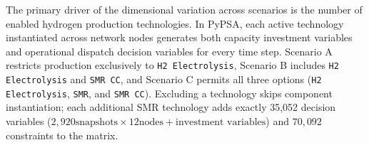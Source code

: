 \documentclass[preprint,12pt]{elsarticle}
\begin{document}
The primary driver of the dimensional variation across scenarios is the number of enabled hydrogen production technologies. In PyPSA, each active technology instantiated across network nodes generates both capacity investment variables and operational dispatch decision variables for every time step. Scenario A restricts production exclusively to \texttt{H2 Electrolysis}, Scenario B includes \texttt{H2 Electrolysis} and \texttt{SMR CC}, and Scenario C permits all three options (\texttt{H2 Electrolysis}, \texttt{SMR}, and \texttt{SMR CC}). Excluding a technology skips component instantiation; each additional SMR technology adds exactly 35,052 decision variables ($2,920 \text{snapshots} \times 12 \text{nodes} + \text{investment variables}$) and $70,092$ constraints to the matrix.




\end{document}
